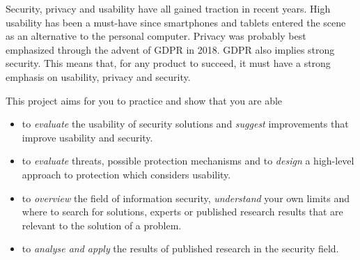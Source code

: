 Security, privacy and usability have all gained traction in recent years.
High usability has been a must-have since smartphones and tablets entered the 
scene as an alternative to the personal computer.
Privacy was probably best emphasized through the advent of \ac{GDPR} in 2018.
\Ac{GDPR} also implies strong security.
This means that, for any product to succeed, it must have a strong emphasis on 
usability, privacy and security.

This project aims for you to practice and show that you are able
\begin{itemize}
  \item to \emph{evaluate} the usability of security solutions and 
    \emph{suggest} improvements that improve usability and security.
  \item to \emph{evaluate} threats, possible protection mechanisms and to 
    \emph{design} a high-level approach to protection which considers 
    usability.
  \item to \emph{overview} the field of information security, \emph{understand} 
    your own limits and where to search for solutions, \eg experts or published 
    research results that are relevant to the solution of a problem.
  \item to \emph{analyse and apply} the results of published research in the 
    security field.
\end{itemize}

